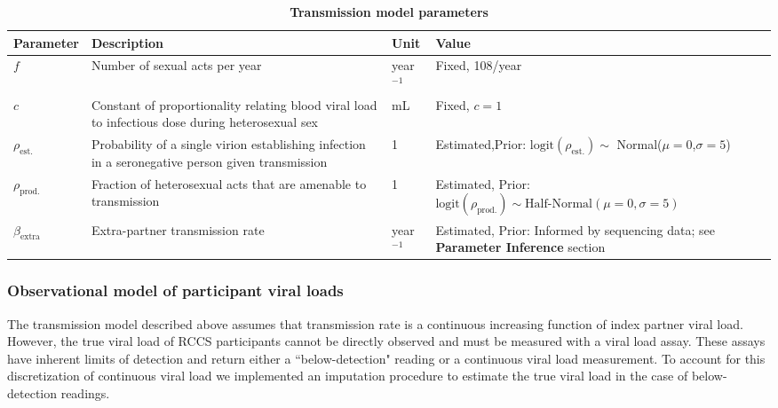 \documentclass{article}[11pt]
\begin{document}
\begin{table}[h!]
\centering
\caption{\textbf{Transmission model parameters}}
\begin{tabular}{p{}p{}p{}L{0.35\textwidth}}
\toprule
\textbf{Parameter} & \textbf{Description} & \textbf{Unit} & \textbf{Value}\\
\midrule
$f$ & Number of sexual acts per year & year$^{-1}$ & Fixed, 108/year \cite{gray2001} \\
$c$ & Constant of proportionality relating blood viral load to infectious dose during heterosexual sex & mL & Fixed, $c=1$ \\
$\rho_\text{est.}$ & Probability of a single virion establishing infection in a seronegative person given transmission & 1 & Estimated,\newline Prior: $\text{logit}(\rho_\text{est.}) \sim$ Normal($\mu=0$,$\sigma=5$)\\
$\rho_\text{prod.}$ & Fraction of heterosexual acts that are amenable to transmission & 1 &  Estimated, \newline Prior: $\text{logit}(\rho_\text{prod.}) \sim \text{Half-Normal}(\mu=0,\sigma=5)$ \\
$\beta_\text{extra}$ & Extra-partner transmission rate & year$^{-1}$  &  Estimated,  \newline Prior: Informed by sequencing data; see \textbf{Parameter Inference} section\\
\bottomrule
\end{tabular}
\label{table:trans_params}
\end{table}
\clearpage

\subsubsection*{Observational model of participant viral loads}

The transmission model described above assumes that transmission rate is a continuous increasing function of index partner viral load. However, the true viral load of RCCS participants cannot be directly observed and must be measured with a viral load assay. These assays have inherent limits of detection and return either a ``below-detection" reading or a continuous viral load measurement. To account for this discretization of continuous viral load we implemented an imputation procedure to estimate the true viral load in the case of below-detection readings. 
\end{document}
